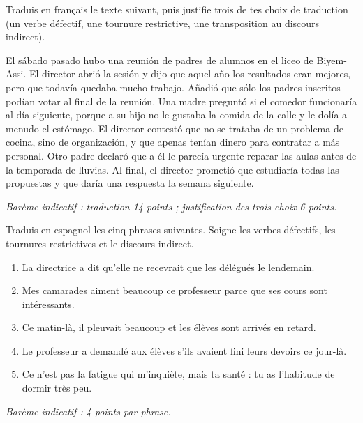 \documentclass[11pt]{article}
\begin{document}
\begin{exercice}
Traduis en français le texte suivant, puis justifie trois de tes choix de traduction (un verbe défectif, une tournure restrictive, une transposition au discours indirect).

\begin{textebox}
El sábado pasado hubo una reunión de padres de alumnos en el liceo de Biyem-Assi. El director abrió la sesión y dijo que aquel año los resultados eran mejores, pero que todavía quedaba mucho trabajo. Añadió que sólo los padres inscritos podían votar al final de la reunión. Una madre preguntó si el comedor funcionaría al día siguiente, porque a su hijo no le gustaba la comida de la calle y le dolía a menudo el estómago. El director contestó que no se trataba de un problema de cocina, sino de organización, y que apenas tenían dinero para contratar a más personal. Otro padre declaró que a él le parecía urgente reparar las aulas antes de la temporada de lluvias. Al final, el director prometió que estudiaría todas las propuestas y que daría una respuesta la semana siguiente.
\end{textebox}

\emph{Barème indicatif : traduction 14 points ; justification des trois choix 6 points.}
\end{exercice}

\begin{exercice}
Traduis en espagnol les cinq phrases suivantes. Soigne les verbes défectifs, les tournures restrictives et le discours indirect.
\begin{enumerate}
\item La directrice a dit qu'elle ne recevrait que les délégués le lendemain.
\item Mes camarades aiment beaucoup ce professeur parce que ses cours sont intéressants.
\item Ce matin-là, il pleuvait beaucoup et les élèves sont arrivés en retard.
\item Le professeur a demandé aux élèves s'ils avaient fini leurs devoirs ce jour-là.
\item Ce n'est pas la fatigue qui m'inquiète, mais ta santé : tu as l'habitude de dormir très peu.
\end{enumerate}
\emph{Barème indicatif : 4 points par phrase.}
\end{exercice}
\end{document}
